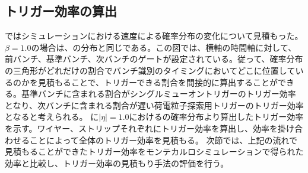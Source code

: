 \subsection{トリガー効率の算出}\label{sec:prot}
ではシミュレーションにおける速度による確率分布の変化について見積もった。$\beta=1.0$の場合は、の分布と同じである。この図では、横軸の時間軸に対して、前バンチ、基準バンチ、次バンチのゲートが設定されている。従って、確率分布の三角形がどれだけの割合でバンチ識別のタイミングにおいてどこに位置しているのかを見積もることで、トリガーできる割合を間接的に算出することができる。基準バンチに含まれる割合がシングルミューオントリガーのトリガー効率となり、次バンチに含まれる割合が遅い荷電粒子探索用トリガーのトリガー効率となると考えられる。
に$|\eta|=1.0$におけるの確率分布より算出したトリガー効率を示す。ワイヤー、ストリップそれぞれにトリガー効率を算出し、効率を掛け合わせることによって全体のトリガー効率を見積もる。
次節では、上記の流れで見積もることができたトリガー効率をモンテカルロシミュレーションで得られた効率と比較し、トリガー効率の見積もり手法の評価を行う。

